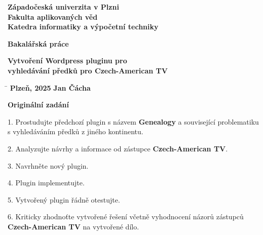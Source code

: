 \documentclass[12pt]{report}
\begin{document}
\thispagestyle{empty}


\begin{center}
    \textbf{\large Západočeská univerzita v Plzni}\\
    \textbf{\large Fakulta aplikovaných věd}\\
    \textbf{\large Katedra informatiky a výpočetní techniky}
    
    \vspace{2cm} %
    \vspace{1cm}
  
    \textbf{\Huge Bakalářská práce}
    
    \vspace{1cm}
 
    \textbf{\Huge Vytvoření Wordpress pluginu pro}\\
    \textbf{\Huge  vyhledávání předků pro Czech-American TV}
    
    \vfill
    \begin{tabbing}
    \hspace{8cm} \= \kill
    \textbf{Plzeň, 2025} \hspace{10cm} \textbf{Jan Čácha}
    \end{tabbing}
    
    \vspace{1cm}

\end{center}
\newpage  %

\begin{center}
    \textbf{\Huge Originální zadání} %
\end{center}

\vspace{1cm} %

\begin{flushleft}

    1. Prostudujte předchozí plugin s názvem \textbf{Genealogy} a související problematiku s vyhledáváním předků z jiného kontinentu.

    2. Analyzujte návrhy a informace od zástupce \textbf{Czech-American TV}.

    3. Navrhněte nový plugin.

    4. Plugin implementujte.

    5. Vytvořený plugin řádně otestujte.

    6. Kriticky zhodnoťte vytvořené řešení včetně vyhodnocení názorů zástupců \textbf{Czech-American TV} na vytvořené dílo.

\end{flushleft}
\newpage  %
\end{document}
